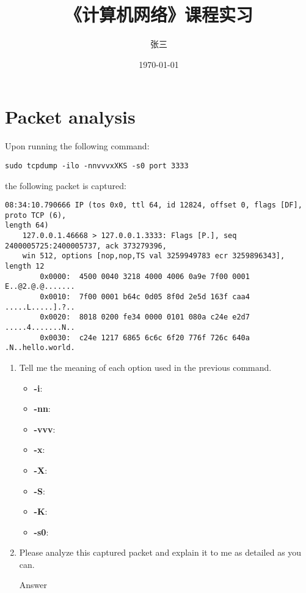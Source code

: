 \documentclass{swfulabreport}
\author{张三}
\date{\today}
\title{《计算机网络》课程实习}
\begin{document}
\maketitle

\section{Packet analysis}
\label{sec:orgb13b384}
Upon running the following command:

\begin{verbatim}
sudo tcpdump -ilo -nnvvvxXKS -s0 port 3333
\end{verbatim}

the following packet is captured:

\begin{verbatim}
08:34:10.790666 IP (tos 0x0, ttl 64, id 12824, offset 0, flags [DF], proto TCP (6),
length 64)
    127.0.0.1.46668 > 127.0.0.1.3333: Flags [P.], seq 2400005725:2400005737, ack 373279396,
    win 512, options [nop,nop,TS val 3259949783 ecr 3259896343], length 12
        0x0000:  4500 0040 3218 4000 4006 0a9e 7f00 0001  E..@2.@.@.......
        0x0010:  7f00 0001 b64c 0d05 8f0d 2e5d 163f caa4  .....L.....].?..
        0x0020:  8018 0200 fe34 0000 0101 080a c24e e2d7  .....4.......N..
        0x0030:  c24e 1217 6865 6c6c 6f20 776f 726c 640a  .N..hello.world.
\end{verbatim}

\begin{enumerate}
\item Tell me the meaning of each option used in the previous command.
\begin{itemize}
\item \textbf{-i}:
\item \textbf{-nn}:
\item \textbf{-vvv}:
\item \textbf{-x}:
\item \textbf{-X}:
\item \textbf{-S}:
\item \textbf{-K}:
\item \textbf{-s0}:
\end{itemize}

\item Please analyze this captured packet and explain it to me as detailed as you can.     
\begin{description}
\item[{Answer}] 
\end{description}
\end{enumerate}
\end{document}
